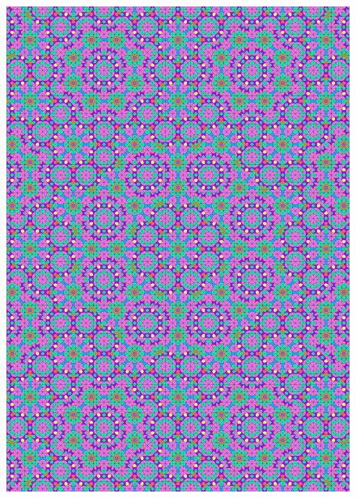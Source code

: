 \documentclass[text.tex]{subfiles}
\begin{document}
\begin{figure}[h!]
\centering
\includegraphics[width=1\textwidth]{img/results/octagon/quasi_polygon-octagon_212132_(-3_3alpha_2).pdf}
\end{figure}
\end{document}
